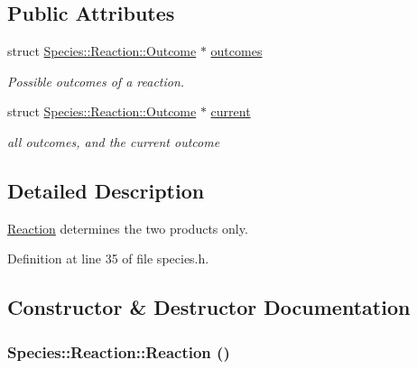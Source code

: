 \subsection*{Public Attributes}
\begin{CompactItemize}
\item 
struct \hyperlink{structSpecies_1_1Reaction_1_1Outcome}{Species::Reaction::Outcome} $\ast$ \hyperlink{structSpecies_1_1Reaction_f7ceec44369f69484487759d39ef9295}{outcomes}
\begin{CompactList}\small\item\em Possible outcomes of a reaction. \item\end{CompactList}\item 
struct \hyperlink{structSpecies_1_1Reaction_1_1Outcome}{Species::Reaction::Outcome} $\ast$ \hyperlink{structSpecies_1_1Reaction_55dc123c04036012bffc584ff41bc046}{current}
\begin{CompactList}\small\item\em all outcomes, and the current outcome \item\end{CompactList}\end{CompactItemize}


\subsection{Detailed Description}
\hyperlink{structSpecies_1_1Reaction}{Reaction} determines the two products only. 

Definition at line 35 of file species.h.

\subsection{Constructor \& Destructor Documentation}
\hypertarget{structSpecies_1_1Reaction_29289bc048b0654d5c01a804ac3e79f6}{
\subsubsection[{Reaction}]{\setlength{\rightskip}{0pt plus 5cm}Species::Reaction::Reaction ()}}
\label{structSpecies_1_1Reaction_29289bc048b0654d5c01a804ac3e79f6}




